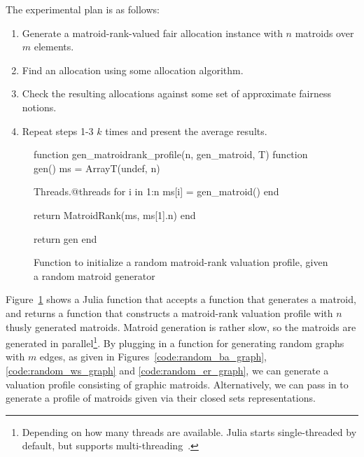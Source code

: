 The experimental plan is as follows:
\begin{enumerate}
  \item Generate a matroid-rank-valued fair allocation instance with $n$ matroids over $m$ elements.
  \item Find an allocation using some allocation algorithm.
  \item Check the resulting allocations against some set of approximate fairness notions.
  \item Repeat steps 1-3 $k$ times and present the average results.
\end{enumerate}

\begin{figure}
  \begin{jllisting}
function gen_matroidrank_profile(n, gen_matroid, T)
  function gen()
    ms = Array{T}(undef, n)

    Threads.@threads for i in 1:n
      ms[i] = gen_matroid()
    end

    return MatroidRank(ms, ms[1].n)
  end

  return gen
end
  \end{jllisting}
  \caption{Function to initialize a random matroid-rank valuation profile, given a random matroid generator}
  \label{code:gen_matroidrank_profile}
\end{figure}

Figure~\ref{code:gen_matroidrank_profile} shows a Julia function that accepts a function that generates a matroid, and returns a function that constructs a matroid-rank valuation profile with $n$ thusly generated matroids. Matroid generation is rather slow, so the matroids are generated in parallel\footnote{Depending on how many threads are available. Julia starts single-threaded by default, but supports multi-threading~\cite{bezanson2017julia}.}. By plugging in a function for generating random graphs with $m$ edges, as given in Figures~\ref{code:random_ba_graph}, \ref{code:random_ws_graph} and \ref{code:random_er_graph}, we can generate a valuation profile consisting of graphic matroids. Alternatively, we can pass in  to generate a profile of matroids given via their closed sets representations.

